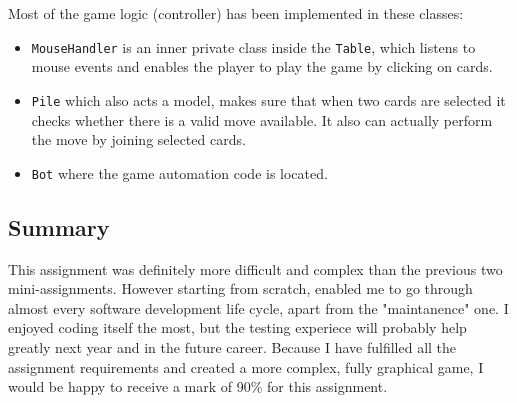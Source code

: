 \documentclass[a4paper, 11pt, titlepage]{article}
\begin{document}
Most of the game logic (controller) has been implemented in these classes:
\begin{itemize}
	\item \texttt{MouseHandler} is an inner private class inside the \texttt{Table}, 
		which listens to mouse events and enables the player to play the game by 
		clicking on cards. 
	
	\item \texttt{Pile} which also acts a model, makes sure that when two cards are 
		selected it checks whether there is a valid move available. It also can actually
		perform the move by joining selected cards.
	
	\item \texttt{Bot} where the game automation code is located. 
\end{itemize}

\subsection{Summary}
This assignment was definitely more difficult and complex than the previous two 
mini-assignments. However starting from scratch, enabled me to go through almost
every software development life cycle, apart from the "maintanence" one. I enjoyed coding
itself the most, but the testing experiece will probably help greatly next year and in
the future career. Because I have fulfilled all the assignment requirements and created 
a more complex, fully graphical game, I would be happy to receive a mark of 90\% for 
this assignment.
\end{document}
